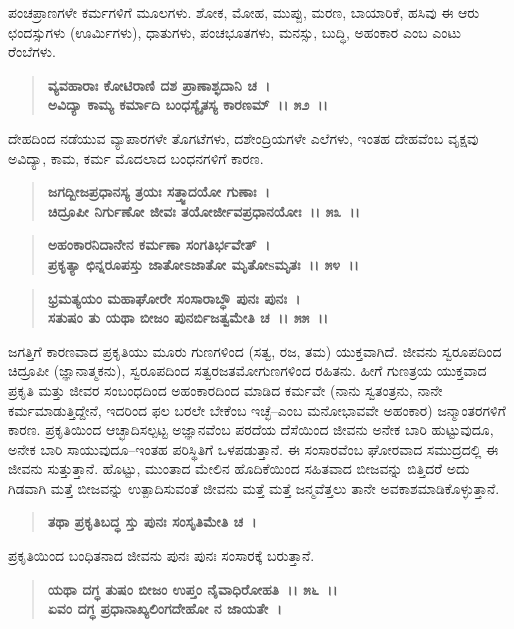 ಪಂಚಪ್ರಾಣಗಳೇ ಕರ್ಮಗಳಿಗೆ ಮೂಲಗಳು. ಶೋಕ, ಮೋಹ, ಮುಪ್ಪು, ಮರಣ, ಬಾಯಾರಿಕೆ, ಹಸಿವು ಈ ಆರು ಛಂದಸ್ಸುಗಳು (ಊರ್ಮಿಗಳು), ಧಾತುಗಳು, ಪಂಚಭೂತಗಳು, ಮನಸ್ಸು, ಬುದ್ಧಿ, ಅಹಂಕಾರ ಎಂಬ ಎಂಟು ರೆಂಬೆಗಳು.

\begin{verse}
\textbf{ವ್ಯವಹಾರಾಃ ಕೋಟಿರಾಣಿ ದಶ ಪ್ರಾಣಾಶ್ಛದಾನಿ ಚ~।}\\\textbf{ಅವಿದ್ಯಾ ಕಾಮ್ಯ ಕರ್ಮಾದಿ ಬಂಧಸ್ಯೈತಸ್ಯ ಕಾರಣಮ್~।। ೫೨~।।}
\end{verse}

ದೇಹದಿಂದ ನಡೆಯುವ ವ್ಯಾಪಾರಗಳೇ ತೊಗಟೆಗಳು, ದಶೇಂದ್ರಿಯಗಳೇ ಎಲೆಗಳು, ಇಂತಹ ದೇಹವೆಂಬ ವೃಕ್ಷವು ಅವಿದ್ಯಾ, ಕಾಮ, ಕರ್ಮ ಮೊದಲಾದ ಬಂಧನಗಳಿಗೆ ಕಾರಣ.

\begin{verse}
\textbf{ಜಗದ್ಬೀಜಪ್ರಧಾನಸ್ಯ ತ್ರಯಃ ಸತ್ತ್ವಾದಯೋ ಗುಣಾಃ~।}\\\textbf{ಚಿದ್ರೂಪೀ ನಿರ್ಗುಣೋ ಜೀವಃ ತಯೋರ್ಜೀವಪ್ರಧಾನಯೋಃ~।। ೫೩~।। }
\end{verse}

\begin{verse}
\textbf{ಅಹಂಕಾರನಿದಾನೇನ ಕರ್ಮಣಾ ಸಂಗತಿರ್ಭವೇತ್~।}\\\textbf{ಪ್ರಕೃತ್ಯಾ ಛಿನ್ನರೂಪಸ್ತು ಜಾತೋಽಜಾತೋ ಮೃತೋsಮೃತಃ~।। ೫೪~।। }
\end{verse}

\begin{verse}
\textbf{ಭ್ರಮತ್ಯಯಂ ಮಹಾಘೋರೇ ಸಂಸಾರಾಬ್ಧೌ ಪುನಃ ಪುನಃ~।}\\\textbf{ಸತುಷಂ ತು ಯಥಾ ಬೀಜಂ ಪುನರ್ಬಿಜತ್ವಮೇತಿ ಚ~।। ೫೫~।।}
\end{verse}

ಜಗತ್ತಿಗೆ ಕಾರಣವಾದ ಪ್ರಕೃತಿಯು ಮೂರು ಗುಣಗಳಿಂದ (ಸತ್ವ, ರಜ, ತಮ) ಯುಕ್ತವಾಗಿದೆ. ಜೀವನು ಸ್ವರೂಪದಿಂದ ಚಿದ್ರೂಪೀ (ಜ್ಞಾನಾತ್ಮಕನು), ಸ್ವರೂಪದಿಂದ ಸತ್ವರಜತಮೋಗುಣಗಳಿಂದ ರಹಿತನು. ಹೀಗೆ ಗುಣತ್ರಯ ಯುಕ್ತವಾದ ಪ್ರಕೃತಿ ಮತ್ತು ಜೀವರ ಸಂಬಂಧದಿಂದ ಅಹಂಕಾರದಿಂದ ಮಾಡಿದ ಕರ್ಮವೇ (ನಾನು ಸ್ವತಂತ್ರನು, ನಾನೇ ಕರ್ಮಮಾಡುತ್ತಿದ್ದೇನೆ, ಇದರಿಂದ ಫಲ ಬರಲೇ ಬೇಕೆಂಬ ಇಚ್ಛೆ–ಎಂಬ ಮನೋಭಾವವೇ ಅಹಂಕಾರ) ಜನ್ಮಾಂತರಗಳಿಗೆ ಕಾರಣ. ಪ್ರಕೃತಿಯಿಂದ ಆಚ್ಛಾದಿಸಲ್ಪಟ್ಟ ಅಜ್ಞಾನವೆಂಬ ಪರದೆಯ ದೆಸೆಯಿಂದ ಜೀವನು ಅನೇಕ ಬಾರಿ ಹುಟ್ಟುವುದೂ, ಅನೇಕ ಬಾರಿ ಸಾಯು\-ವುದೂ–ಇಂತಹ ಪರಿಸ್ಥಿತಿಗೆ ಒಳಪಡುತ್ತಾನೆ. ಈ ಸಂಸಾರವೆಂಬ ಘೋರವಾದ ಸಮುದ್ರದಲ್ಲಿ ಈ ಜೀವನು ಸುತ್ತುತ್ತಾನೆ. ಹೊಟ್ಟು, ಮುಂತಾದ ಮೇಲಿನ ಹೊದಿಕೆಯಿಂದ ಸಹಿತವಾದ ಬೀಜವನ್ನು ಬಿತ್ತಿದರೆ ಅದು ಗಿಡವಾಗಿ ಮತ್ತೆ ಬೀಜವನ್ನು ಉತ್ಪಾದಿಸುವಂತೆ ಜೀವನು ಮತ್ತೆ ಮತ್ತೆ ಜನ್ಮವೆತ್ತಲು ತಾನೇ ಅವಕಾಶಮಾಡಿಕೊಳ್ಳುತ್ತಾನೆ.

\begin{verse}
\textbf{ತಥಾ ಪ್ರಕೃತಿಬದ್ಧ ಸ್ತು ಪುನಃ ಸಂಸೃತಿಮೇತಿ ಚ~।}
\end{verse}

ಪ್ರಕೃತಿಯಿಂದ ಬಂಧಿತನಾದ ಜೀವನು ಪುನಃ ಪುನಃ ಸಂಸಾರಕ್ಕೆ ಬರುತ್ತಾನೆ.

\begin{verse}
\textbf{ಯಥಾ ದಗ್ಧ ತುಷಂ ಬೀಜಂ ಉಪ್ತಂ ನೈವಾಧಿರೋಹತಿ~।। ೫೬~।।}\\\textbf{ಏವಂ ದಗ್ಧ ಪ್ರಧಾನಾಖ್ಯಲಿಂಗದೇಹೋ ನ ಜಾಯತೇ~।}
\end{verse}


